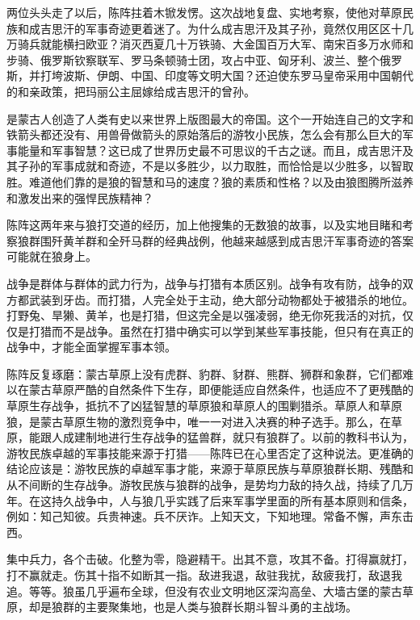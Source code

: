 \par 
\par 两位头头走了以后，陈阵拄着木锨发愣。这次战地复盘、实地考察，使他对草原民族和成吉思汗的军事奇迹更着迷了。为什么成吉思汗及其子孙，竟然仅用区区十几万骑兵就能横扫欧亚？消灭西夏几十万铁骑、大金国百万大军、南宋百多万水师和步骑、俄罗斯钦察联军、罗马条顿骑士团，攻占中亚、匈牙利、波兰、整个俄罗斯，并打垮波斯、伊朗、中国、印度等文明大国？还迫使东罗马皇帝采用中国朝代的和亲政策，把玛丽公主屈嫁给成吉思汗的曾孙。
\par 是蒙古人创造了人类有史以来世界上版图最大的帝国。这个一开始连自己的文字和铁箭头都还没有、用兽骨做箭头的原始落后的游牧小民族，怎么会有那么巨大的军事能量和军事智慧？这已成了世界历史最不可思议的千古之谜。而且，成吉思汗及其子孙的军事成就和奇迹，不是以多胜少，以力取胜，而恰恰是以少胜多，以智取胜。难道他们靠的是狼的智慧和马的速度？狼的素质和性格？以及由狼图腾所滋养和激发出来的强悍民族精神？
\par 陈阵这两年来与狼打交道的经历，加上他搜集的无数狼的故事，以及实地目睹和考察狼群围歼黄羊群和全歼马群的经典战例，他越来越感到成吉思汗军事奇迹的答案可能就在狼身上。
\par 战争是群体与群体的武力行为，战争与打猎有本质区别。战争有攻有防，战争的双方都武装到牙齿。而打猎，人完全处于主动，绝大部分动物都处于被猎杀的地位。打野兔、旱獭、黄羊，也是打猎，但这完全是以强凌弱，绝无你死我活的对抗，仅仅是打猎而不是战争。虽然在打猎中确实可以学到某些军事技能，但只有在真正的战争中，才能全面掌握军事本领。
\par 陈阵反复琢磨：蒙古草原上没有虎群、豹群、豺群、熊群、狮群和象群，它们都难以在蒙古草原严酷的自然条件下生存，即便能适应自然条件，也适应不了更残酷的草原生存战争，抵抗不了凶猛智慧的草原狼和草原人的围剿猎杀。草原人和草原狼，是蒙古草原生物的激烈竞争中，唯一一对进入决赛的种子选手。那么，在草原，能跟人成建制地进行生存战争的猛兽群，就只有狼群了。以前的教科书认为，游牧民族卓越的军事技能来源于打猎——陈阵已在心里否定了这种说法。更准确的结论应该是：游牧民族的卓越军事才能，来源于草原民族与草原狼群长期、残酷和从不间断的生存战争。游牧民族与狼群的战争，是势均力敌的持久战，持续了几万年。在这持久战争中，人与狼几乎实践了后来军事学里面的所有基本原则和信条，例如：知己知彼。兵贵神速。兵不厌诈。上知天文，下知地理。常备不懈，声东击西。
\par 集中兵力，各个击破。化整为零，隐避精干。出其不意，攻其不备。打得赢就打，打不赢就走。伤其十指不如断其一指。敌进我退，敌驻我扰，敌疲我打，敌退我追。等等。狼虽几乎遍布全球，但没有农业文明地区深沟高垒、大墙古堡的蒙古草原，却是狼群的主要聚集地，也是人类与狼群长期斗智斗勇的主战场。
